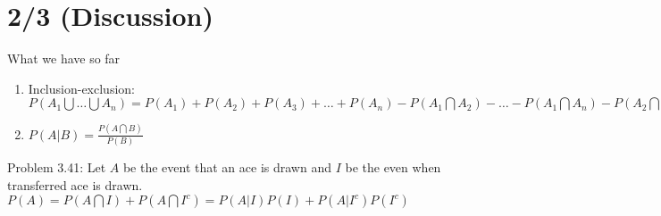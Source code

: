 \section*{2/3 (Discussion)}
  What we have so far
  \begin{enumerate}
    \item Inclusion-exclusion: $P(A_1 \bigcup \ldots \bigcup A_n) = P(A_1)
    + P(A_2) + P(A_3) + \ldots + P(A_n) - P(A_1 \bigcap A_2) - \ldots
    - P(A_1 \bigcap A_n) - P(A_2 \bigcap A_3) - \ldots P(A_{n-1} \bigcap
    A_n) + P(A_1 \bigcap A_2 \bigcap A_3) + \ldots$
    \item $P(A|B) = \frac{P(A \bigcap B)}{P(B)}$
  \end{enumerate}
  Problem 3.41: Let $A$ be the event that an ace is drawn and $I$ be 
  the even when transferred ace is drawn.\\
  $P(A) = P(A \bigcap I) + P(A \bigcap I^c) = P(A| I)P(I) + P(A|I^c)P(I^c)$ \\

